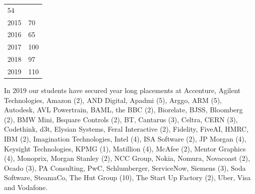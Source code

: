\documentclass[
  12pt,
]{book}
\begin{document}
\begin{longtable}[]{@{}ll@{}}
\begin{minipage}[t]{0.47\columnwidth}
54\strut
\end{minipage}\tabularnewline
\begin{minipage}[t]{0.47\columnwidth}\raggedright
2015\strut
\end{minipage} & \begin{minipage}[t]{0.47\columnwidth}\raggedright
70\strut
\end{minipage}\tabularnewline
\begin{minipage}[t]{0.47\columnwidth}\raggedright
2016\strut
\end{minipage} & \begin{minipage}[t]{0.47\columnwidth}\raggedright
65\strut
\end{minipage}\tabularnewline
\begin{minipage}[t]{0.47\columnwidth}\raggedright
2017\strut
\end{minipage} & \begin{minipage}[t]{0.47\columnwidth}\raggedright
100\strut
\end{minipage}\tabularnewline
\begin{minipage}[t]{0.47\columnwidth}\raggedright
2018\strut
\end{minipage} & \begin{minipage}[t]{0.47\columnwidth}\raggedright
97\strut
\end{minipage}\tabularnewline
\begin{minipage}[t]{0.47\columnwidth}\raggedright
2019\strut
\end{minipage} & \begin{minipage}[t]{0.47\columnwidth}\raggedright
110\strut
\end{minipage}\tabularnewline
\bottomrule
\end{longtable}

In 2019 our students have secured year long placements at Accenture, Agilent Technologies, Amazon (2), AND Digital, Apadmi (5), Arggo, ARM (5), Autodesk, AVL Powertrain, BAML, the BBC (2), Biorelate, BJSS, Bloomberg (2), BMW Mini, Bsquare Controls (2), BT, Cantarus (3), Celtra, CERN (3), Codethink, d3t, Elysian Systems, Feral Interactive (2), Fidelity, FiveAI, HMRC, IBM (2), Imagination Technologies, Intel (4), ISA Software (2), JP Morgan (4), Keysight Technologies, KPMG (1), Matillion (4), McAfee (2), Mentor Graphics (4), Monoprix, Morgan Stanley (2), NCC Group, Nokia, Nomura, Novacoast (2), Ocado (3), PA Consulting, PwC, Schlumberger, ServiceNow, Siemens (3), Soda Software, SteamaCo, The Hut Group (10),
The Start Up Factory (2), Uber, Visa and Vodafone.
\end{document}
